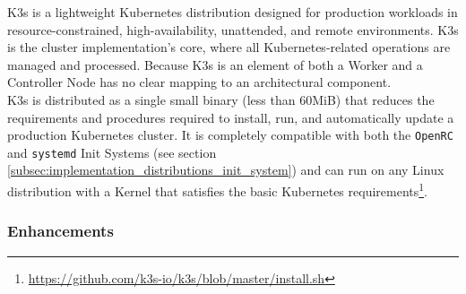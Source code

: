 K3s is a lightweight Kubernetes distribution designed for production workloads in
resource-constrained, high-availability, unattended, and remote environments\cite{k3s}.
K3s is the cluster implementation's core, where all Kubernetes-related operations
are managed and processed. Because K3s is an element of both a Worker and a
Controller Node has no clear mapping to an architectural component. \\ %
K3s is distributed as a single small binary (less than 60MiB) that reduces the
requirements and procedures required to install, run, and automatically update a
production Kubernetes cluster\cite{k3s}. It is completely compatible with both
the \texttt{OpenRC} and \texttt{systemd} Init Systems (see section \ref{subsec:implementation_distributions_init_system})
and can run on any Linux distribution with a Kernel that satisfies the basic
Kubernetes requirements\footnote{\url{https://github.com/k3s-io/k3s/blob/master/install.sh}}.

\subsubsection{Enhancements}
\label{subsubsec:implementation_dependencies_k3s_enhancements}

